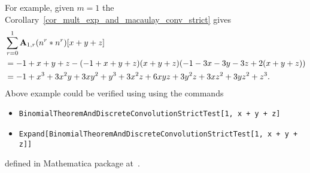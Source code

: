 For example, given $m=1$ the Corollary~\ref{cor_mult_exp_and_macaulay_conv_strict} gives
\begin{equation*}
    \begin{split}
        &\sum_{r=0}^{1} {\mathbf{A}} \sb{1,r} (n \sp{r} \ast n \sp{r}) [x+y+z] \\
        &=-1 + x + y + z - (-1 + x + y + z) (x + y + z) (-1 - 3 x - 3 y - 3 z + 2 (x + y + z)) \\
        &=-1 + x^3 + 3 x^2 y + 3 x y^2 + y^3 + 3 x^2 z + 6 x y z + 3 y^2 z + 3 x z^2 + 3 y z^2 + z^3.
    \end{split}
\end{equation*}
Above example could be verified using using the commands
\begin{itemize}
    \item \texttt{BinomialTheoremAndDiscreteConvolutionStrictTest[1, x + y + z]}
    \item \texttt{Expand[BinomialTheoremAndDiscreteConvolutionStrictTest[1, x + y + z]]}
\end{itemize}
defined in Mathematica package at~\cite{PK22Source}.
